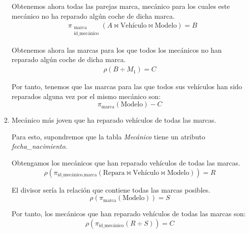 \begin{ejercicio}
\begin{enumerate}
        Obtenemos ahora todas las parejas marca, mecánico para los cuales este mecánico no ha reparado algún coche de dicha marca.
        \begin{align*}
            &\pi_{\substack{\text{marca}\\\text{id\_mecánico}}}(A\bowtie \text{Vehículo} \bowtie \text{Modelo})=B
        \end{align*}

        Obtenemos ahora las marcas para los que todos los mecánicos no han reparado algún coche de dicha marca.
        \begin{align*}
            \rho\left(B\div M_1\right)=C
        \end{align*}

        Por tanto, tenemos que las marcas para las que todos sus vehículos han sido reparados alguna vez por el mismo mecánico son:
        \begin{equation*}
            \pi_{\text{marca}}(\text{Modelo})-C
        \end{equation*}

        \item Mecánico más joven que ha reparado vehículos de todas las marcas.
        
        \begin{observacion}
            Para esto, supondremos que la tabla \emph{Mecánico} tiene un atributo \emph{fecha\_nacimiento}.
        \end{observacion}
        
        Obtengamos los mecánicos que han reparado vehículos de todas las marcas.
        \begin{equation*}
            \rho\left(\pi_{\text{id\_mecánico},\text{marca}}(\text{Repara}\bowtie \text{Vehículo}\bowtie \text{Modelo})\right) = R
        \end{equation*}

        El divisor sería la relación que contiene todas las marcas posibles.
        \begin{equation*}
            \rho(\pi_{\text{marca}}(\text{Modelo})) = S
        \end{equation*}

        Por tanto, los mecánicos que han reparado vehículos de todas las marcas son:
        \begin{equation*}
            \rho(\pi_{\text{id\_mecánico}}(R \div S))=C
        \end{equation*}


\end{enumerate}
\end{ejercicio}
